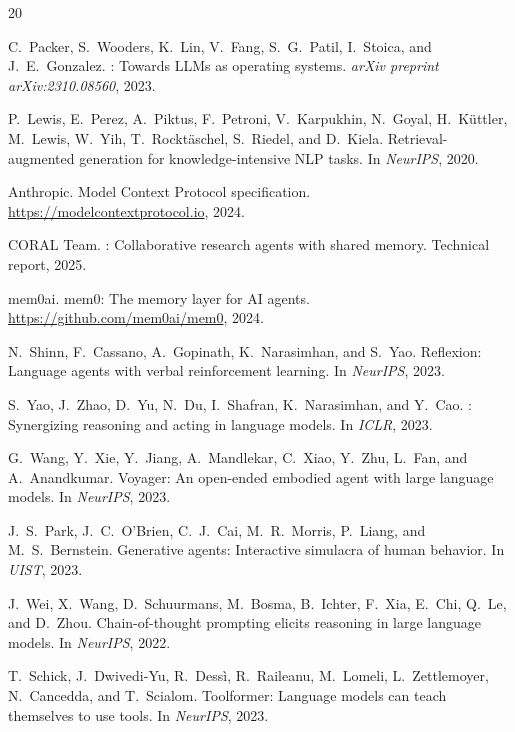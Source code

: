 \documentclass{article}
\begin{document}
\begin{thebibliography}{20}

C.~Packer, S.~Wooders, K.~Lin, V.~Fang, S.~G.~Patil, I.~Stoica, and J.~E.~Gonzalez.
: Towards {LLMs} as operating systems.
\newblock \emph{arXiv preprint arXiv:2310.08560}, 2023.

P.~Lewis, E.~Perez, A.~Piktus, F.~Petroni, V.~Karpukhin, N.~Goyal, H.~K{\"u}ttler, M.~Lewis, W.~Yih, T.~Rockt{\"a}schel, S.~Riedel, and D.~Kiela.
\newblock Retrieval-augmented generation for knowledge-intensive {NLP} tasks.
\newblock In \emph{NeurIPS}, 2020.

Anthropic.
\newblock Model Context Protocol specification.
\newblock \url{https://modelcontextprotocol.io}, 2024.

CORAL Team.
: Collaborative research agents with shared memory.
\newblock Technical report, 2025.

mem0ai.
\newblock mem0: The memory layer for {AI} agents.
\newblock \url{https://github.com/mem0ai/mem0}, 2024.

N.~Shinn, F.~Cassano, A.~Gopinath, K.~Narasimhan, and S.~Yao.
\newblock Reflexion: Language agents with verbal reinforcement learning.
\newblock In \emph{NeurIPS}, 2023.

S.~Yao, J.~Zhao, D.~Yu, N.~Du, I.~Shafran, K.~Narasimhan, and Y.~Cao.
: Synergizing reasoning and acting in language models.
\newblock In \emph{ICLR}, 2023.

G.~Wang, Y.~Xie, Y.~Jiang, A.~Mandlekar, C.~Xiao, Y.~Zhu, L.~Fan, and A.~Anandkumar.
\newblock Voyager: An open-ended embodied agent with large language models.
\newblock In \emph{NeurIPS}, 2023.

J.~S.~Park, J.~C.~O'Brien, C.~J.~Cai, M.~R.~Morris, P.~Liang, and M.~S.~Bernstein.
\newblock Generative agents: Interactive simulacra of human behavior.
\newblock In \emph{UIST}, 2023.

J.~Wei, X.~Wang, D.~Schuurmans, M.~Bosma, B.~Ichter, F.~Xia, E.~Chi, Q.~Le, and D.~Zhou.
\newblock Chain-of-thought prompting elicits reasoning in large language models.
\newblock In \emph{NeurIPS}, 2022.

T.~Schick, J.~Dwivedi-Yu, R.~Dess{\`i}, R.~Raileanu, M.~Lomeli, L.~Zettlemoyer, N.~Cancedda, and T.~Scialom.
\newblock Toolformer: Language models can teach themselves to use tools.
\newblock In \emph{NeurIPS}, 2023.


\end{thebibliography}
\end{document}
